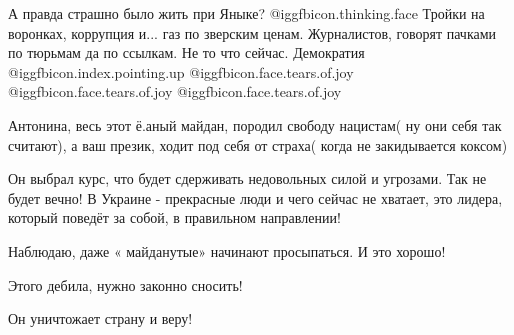 \begin{itemize}
А правда страшно было жить при Яныке?  @igg{fbicon.thinking.face}  Тройки на воронках, коррупция и... газ
по зверским ценам. Журналистов, говорят пачками по тюрьмам да по ссылкам. Не то
что сейчас. Демократия @igg{fbicon.index.pointing.up}  @igg{fbicon.face.tears.of.joy}   @igg{fbicon.face.tears.of.joy}   @igg{fbicon.face.tears.of.joy} 


Антонина, весь этот ё.аный майдан, породил свободу нацистам( ну они себя так
считают), а ваш презик, ходит под себя от страха( когда не закидывается коксом)

Он выбрал курс, что будет сдерживать недовольных силой и угрозами. Так не будет
вечно! В Украине - прекрасные люди и чего сейчас не хватает, это лидера, который
поведёт за собой, в правильном направлении!

Наблюдаю, даже « майданутые» начинают просыпаться. И это хорошо!

Этого дебила, нужно законно сносить!

Он уничтожает страну и веру!

\end{itemize} %
